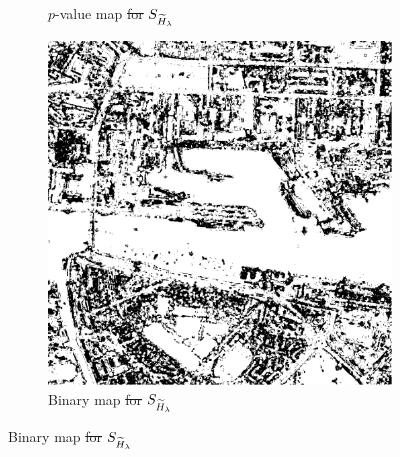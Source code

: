 \documentclass[
  lettersize  journal,
]{IEEEtran}%
\providecommand{\DIFaddtex}[1]{{\protect\color{blue}\uwave{#1}}} %
\providecommand{\DIFdeltex}[1]{{\protect\color{red}\sout{#1}}} %
\providecommand{\DIFaddFL}[1]{\DIFadd{#1}} %
\providecommand{\DIFdelFL}[1]{\DIFdel{#1}} %
\providecommand{\DIFaddbeginFL}{} %
\providecommand{\DIFaddendFL}{} %
\providecommand{\DIFdelbeginFL}{} %
\providecommand{\DIFdelendFL}{} %
\providecommand{\DIFadd}[1]{\texorpdfstring{\DIFaddtex{#1}}{#1}} %
\providecommand{\DIFdel}[1]{\texorpdfstring{\DIFdeltex{#1}}{}} %
\newcommand{\DIFscaledelfig}{0.5}
\newlength{\DIFdelgraphicswidth} %
\newlength{\DIFdelgraphicsheight} %
\newcommand{\DIFaddincludegraphics}[2][]{{\color{blue}\fbox{\DIFOincludegraphics[#1]{#2}}}} %
\newcommand{\DIFdelincludegraphics}[2][]{%
\sbox{\DIFdelgraphicsbox}{\DIFOincludegraphics[#1]{#2}}%
\settoboxwidth{\DIFdelgraphicswidth}{\DIFdelgraphicsbox} %
\settoboxtotalheight{\DIFdelgraphicsheight}{\DIFdelgraphicsbox} %
\scalebox{\DIFscaledelfig}{%
\parbox[b]{\DIFdelgraphicswidth}{\usebox{\DIFdelgraphicsbox}\\[-\baselineskip] \rule{\DIFdelgraphicswidth}{0em}}\llap{\resizebox{\DIFdelgraphicswidth}{\DIFdelgraphicsheight}{%
\setlength{\unitlength}{\DIFdelgraphicswidth}%
\begin{picture}(1,1)%
\thicklines\linethickness{2pt} %
{\color[rgb]{1,0,0}\put(0,0){\framebox(1,1){}}}%
{\color[rgb]{1,0,0}\put(0,0){\line( 1,1){1}}}%
{\color[rgb]{1,0,0}\put(0,1){\line(1,-1){1}}}%
\end{picture}%
}\hspace*{3pt}}} %
} %
\DeclareRobustCommand{\DIFaddbeginFL}{\DIFOaddbeginFL \let\includegraphics\DIFaddincludegraphics} %
\DeclareRobustCommand{\DIFaddendFL}{\DIFOaddendFL \let\includegraphics\DIFOincludegraphics} %
\DeclareRobustCommand{\DIFdelbeginFL}{\DIFOdelbeginFL \let\includegraphics\DIFdelincludegraphics} %
\DeclareRobustCommand{\DIFdelendFL}{\DIFOaddendFL \let\includegraphics\DIFOincludegraphics} %
\begin{document}
\begin{figure}[hbt]
\begin{subfigure}{0.178\textwidth}
        \caption{\DIFaddendFL $p$-value map \DIFdelbeginFL \DIFdelFL{for }\DIFdelendFL $\small{S_{\widetilde{H}_{\lambda}}}$}
        \DIFdelbeginFL %
\DIFdelendFL \DIFaddbeginFL \label{fig:dublin-renyi}
    \DIFaddendFL \end{subfigure}
    \DIFdelbeginFL %
\DIFdelendFL \DIFaddbeginFL \DIFaddFL{\hspace{0.00001\textwidth}
    }\begin{subfigure}{0.144\textwidth}
        \includegraphics[width=\linewidth]{./Figures-R1/H_005_dublin_renyi.png}
        \DIFaddendFL \caption{Binary map \DIFdelbeginFL \DIFdelFL{for }\DIFdelendFL $\small{S_{\widetilde{H}_{\lambda}}}$}
        \DIFdelbeginFL %
\DIFdelendFL \DIFaddbeginFL \label{fig:dublin-005-renyi}
    \DIFaddendFL \end{subfigure}
    \DIFdelbeginFL %
\DIFdelendFL \DIFaddbeginFL \DIFaddFL{\hspace{0.00001\textwidth}
}
\end{figure}
\end{document}
